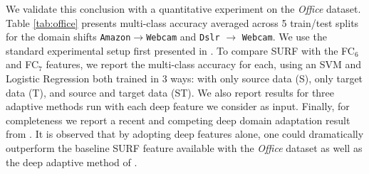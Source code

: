 We validate this conclusion with a quantitative experiment on the \textit{Office} dataset. Table \ref{tab:office} presents multi-class accuracy averaged across 5 train/test splits for the domain shifts \texttt{Amazon}$\rightarrow$\texttt{Webcam} and \texttt{Dslr} $\rightarrow$ \texttt{Webcam}. We use the standard experimental setup first presented in \cite{saenko2010adapting}. To compare SURF with the FC$_6$ and FC$_7$ features, we report the multi-class accuracy for each, using an SVM and Logistic Regression both trained in 3 ways: with only source data (S), only target data (T), and source and target data (ST). We also report results for three adaptive methods run with each deep feature we consider as input. Finally, for completeness we report a recent and competing deep domain adaptation result from \cite{ref:dlid}. It is observed that by adopting deep features alone, one could dramatically outperform the baseline SURF feature available with the \textit{Office} dataset as well as the deep adaptive method of \cite{ref:dlid}. 


